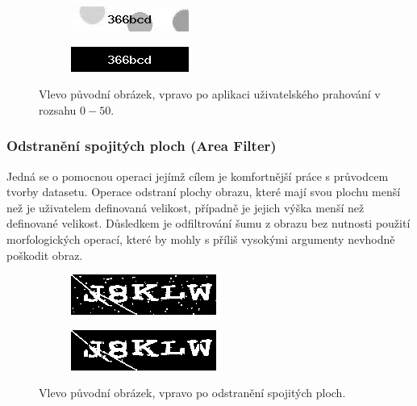 \documentclass[
  field=ainfp,
  master=true,
  biblatex,
  sourcecodes=false,
  theorems=false,
  glossaries,
  index
]{kidiplom}
\begin{document}
\begin{figure}[H]
\centering
\begin{subfigure}{.5\textwidth}
  \centering
  \includegraphics[width=.8\linewidth]{images/custom_original.png}
\end{subfigure}%
\begin{subfigure}{.5\textwidth}
  \centering
  \includegraphics[width=.8\linewidth]{images/custom_result_0_50.png}
\end{subfigure}
\caption{Vlevo původní obrázek, vpravo po aplikaci uživatelského prahování v rozsahu $0 - 50$.}
\label{fig:inverse_example}
\end{figure}

\subsubsection*{Odstranění spojitých ploch (Area Filter)}
Jedná se o pomocnou operaci jejímž cílem je komfortnější práce s průvodcem tvorby datasetu. Operace odstraní plochy obrazu, které mají svou plochu menší než je uživatelem definovaná velikost, případně je jejich výška menší než definované velikost. Důsledkem je odfiltrování šumu z obrazu bez nutnosti použití morfologických operací, které by mohly s příliš vysokými argumenty nevhodně poškodit obraz.
\begin{figure}[H]
\centering
\begin{subfigure}{.5\textwidth}
  \centering
  \includegraphics[width=.8\linewidth]{images/filter_original.png}
\end{subfigure}%
\begin{subfigure}{.5\textwidth}
  \centering
  \includegraphics[width=.8\linewidth]{images/filter_result.png}
\end{subfigure}
\caption{Vlevo původní obrázek, vpravo po odstranění spojitých ploch.}
\label{fig:inverse_example}
\end{figure}
\end{document}
